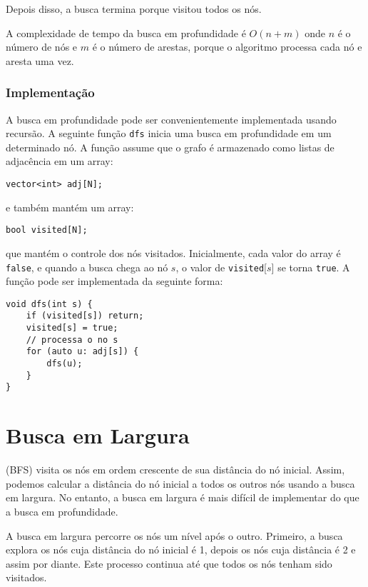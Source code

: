 Depois disso, a busca termina porque visitou todos os nós.

A complexidade de tempo da busca em profundidade é $O(n+m)$ onde $n$ é o número de nós e $m$ é o número de arestas, porque o algoritmo processa cada nó e aresta uma vez.

\subsubsection*{Implementação}

A busca em profundidade pode ser convenientemente implementada usando recursão. A seguinte função \texttt{dfs} inicia uma busca em profundidade em um determinado nó. A função assume que o grafo é armazenado como listas de adjacência em um array:

\begin{lstlisting}
vector<int> adj[N];
\end{lstlisting}

e também mantém um array:

\begin{lstlisting}
bool visited[N];
\end{lstlisting}

que mantém o controle dos nós visitados. Inicialmente, cada valor do array é \texttt{false}, e quando a busca chega ao nó $s$, o valor de \texttt{visited}[$s$] se torna \texttt{true}. A função pode ser implementada da seguinte forma:

\begin{lstlisting}
void dfs(int s) {
    if (visited[s]) return;
    visited[s] = true;
    // processa o no s
    for (auto u: adj[s]) {
        dfs(u);
    }
}
\end{lstlisting}

\section{Busca em Largura}


 (BFS) visita os nós em ordem crescente de sua distância do nó inicial. Assim, podemos calcular a distância do nó inicial a todos os outros nós usando a busca em largura. No entanto, a busca em largura é mais difícil de implementar do que a busca em profundidade.

A busca em largura percorre os nós um nível após o outro. Primeiro, a busca explora os nós cuja distância do nó inicial é 1, depois os nós cuja distância é 2 e assim por diante. Este processo continua até que todos os nós tenham sido visitados.

